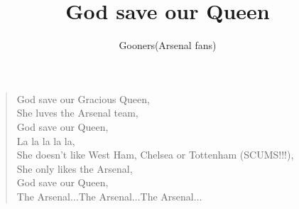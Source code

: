 \documentclass[a4paper,12pt]{article}
\title{God save our Queen}
\author{Gooners(Arsenal fans)}
\date{}
\begin{document}
	
	\maketitle
	
	\begin{verse}
		
		God save our Gracious Queen, \\
		She luves the Arsenal team, \\
		God save our Queen, \\
		La la la la la, \\
		She doesn't like West Ham, Chelsea or Tottenham (SCUMS!!!), \\
		She only likes the Arsenal, \\
		God save our Queen, \\
		The Arsenal$\ldots$The Arsenal$\ldots$The Arsenal$\ldots$
		
	\end{verse}
	
\end{document}
